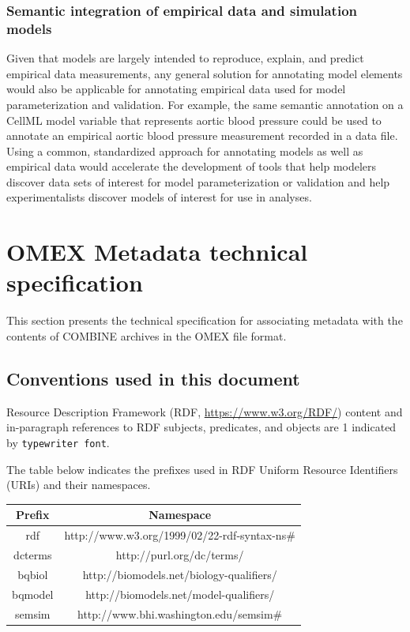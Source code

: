 \documentclass[pdftex,rgb,dvipsnames,svgnames,hyperref,table]{report}
\begin{document}
\subsection{Semantic integration of empirical data and simulation models}
Given that models are largely intended to reproduce, explain, and predict empirical data measurements, any general solution for annotating model elements would also be applicable for annotating empirical data used for model parameterization and validation. For example, the same semantic annotation on a CellML model variable that represents aortic blood pressure could be used to annotate an empirical aortic blood pressure measurement recorded in a data file. Using a common, standardized approach for annotating models as well as empirical data would accelerate the development of tools that help modelers discover data sets of interest for model parameterization or validation and help experimentalists discover models of interest for use in analyses. 


 \label{sec:intro1}
\pagebreak

\chapter{OMEX Metadata technical specification}
\vspace{5mm}

\label{chp:specification}
This section presents the technical specification for associating metadata with the contents of COMBINE archives \cite{Bergmann2014} in the OMEX file format.

\section{Conventions used in this document}
Resource Description Framework (RDF, \url{https://www.w3.org/RDF/}) content and in-paragraph references to RDF subjects, predicates, and objects are 
1
 indicated by \texttt{typewriter font}.

The table below indicates the prefixes used in RDF Uniform Resource Identifiers (URIs) and their namespaces.
\begin{center}
 \begin{tabular}{||c c||} 
 \hline
 Prefix & Namespace \\
 \hline\hline
 rdf & http://www.w3.org/1999/02/22-rdf-syntax-ns\# \\ 
 \hline
 dcterms & http://purl.org/dc/terms/ \\
 \hline
 bqbiol & http://biomodels.net/biology-qualifiers/ \\
 \hline
 bqmodel & http://biomodels.net/model-qualifiers/ \\
 \hline
 semsim & http://www.bhi.washington.edu/semsim\# \\
 \hline
\end{tabular}
\end{center}
\end{document}
